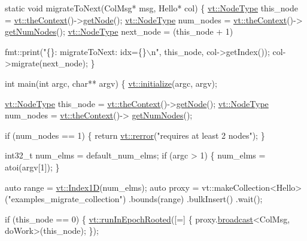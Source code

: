 \begin{DoxyCodeInclude}
\textcolor{keyword}{static} \textcolor{keywordtype}{void} migrateToNext(ColMsg* msg, Hello* col) \{
  \hyperlink{namespacevt_a866da9d0efc19c0a1ce79e9e492f47e2}{vt::NodeType} this\_node = \hyperlink{namespacevt_a26551fe0e6e6a1371111df5b12c7e92c}{vt::theContext}()->\hyperlink{structvt_1_1ctx_1_1_context_a0d52c263ce8516546a67443d9a86fa5f}{getNode}();
  \hyperlink{namespacevt_a866da9d0efc19c0a1ce79e9e492f47e2}{vt::NodeType} num\_nodes = \hyperlink{namespacevt_a26551fe0e6e6a1371111df5b12c7e92c}{vt::theContext}()->
      \hyperlink{structvt_1_1ctx_1_1_context_a7f41071aadf6d5fa9e1b6c703c5ff19d}{getNumNodes}();
  \hyperlink{namespacevt_a866da9d0efc19c0a1ce79e9e492f47e2}{vt::NodeType} next\_node = (this\_node + 1) %

  fmt::print(\textcolor{stringliteral}{"\{\}: migrateToNext: idx=\{\}\(\backslash\)n"}, this\_node, col->getIndex());
  col->migrate(next\_node);
\}

\textcolor{keywordtype}{int} main(\textcolor{keywordtype}{int} argc, \textcolor{keywordtype}{char}** argv) \{
  \hyperlink{namespacevt_aae6ab5af3e11886ce73c4c3ffa008201}{vt::initialize}(argc, argv);

  \hyperlink{namespacevt_a866da9d0efc19c0a1ce79e9e492f47e2}{vt::NodeType} this\_node = \hyperlink{namespacevt_a26551fe0e6e6a1371111df5b12c7e92c}{vt::theContext}()->\hyperlink{structvt_1_1ctx_1_1_context_a0d52c263ce8516546a67443d9a86fa5f}{getNode}();
  \hyperlink{namespacevt_a866da9d0efc19c0a1ce79e9e492f47e2}{vt::NodeType} num\_nodes = \hyperlink{namespacevt_a26551fe0e6e6a1371111df5b12c7e92c}{vt::theContext}()->
      \hyperlink{structvt_1_1ctx_1_1_context_a7f41071aadf6d5fa9e1b6c703c5ff19d}{getNumNodes}();

  \textcolor{keywordflow}{if} (num\_nodes == 1) \{
    \textcolor{keywordflow}{return} \hyperlink{namespacevt_aff96ace008dc847d4c0f44cfa5dfb3a0}{vt::rerror}(\textcolor{stringliteral}{"requires at least 2 nodes"});
  \}

  int32\_t num\_elms = default\_num\_elms;
  \textcolor{keywordflow}{if} (argc > 1) \{
    num\_elms = atoi(argv[1]);
  \}

  \textcolor{keyword}{auto} range = \hyperlink{namespacevt_a5540efc78234273e1796fb003fe4d234}{vt::Index1D}(num\_elms);
  \textcolor{keyword}{auto} proxy = vt::makeCollection<Hello>(\textcolor{stringliteral}{"examples\_migrate\_collection"})
    .bounds(range)
    .bulkInsert()
    .wait();

  \textcolor{keywordflow}{if} (this\_node == 0) \{
    \hyperlink{namespacevt_a9f5cbbc484d7f14f2ad0ee46d62dfb6e}{vt::runInEpochRooted}([=] \{ proxy.\hyperlink{structvt_1_1objgroup_1_1proxy_1_1_proxy_a0b716ca776b1f06e0d7d45afbe9e5274}{broadcast}<ColMsg, doWork>(this\_node); \});


\end{DoxyCodeInclude}
